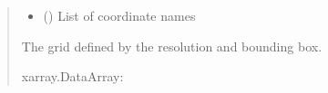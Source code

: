\documentclass[letterpaper,10pt,english]{sphinxmanual}
\begin{document}
\begin{fulllineitems}
\begin{quote}
\begin{description}
\begin{itemize}
\item {}
\sphinxAtStartPar
{} (\sphinxstyleliteralemphasis{\sphinxupquote{{[}}}\sphinxstyleliteralemphasis{\sphinxupquote{{]}}}) \textendash{} List of coordinate names

\end{itemize}

\sphinxAtStartPar
{} \textendash{} The grid defined by the resolution and bounding box.

\sphinxAtStartPar
xarray.DataArray:

\end{description}\end{quote}

\end{fulllineitems}

\end{document}
